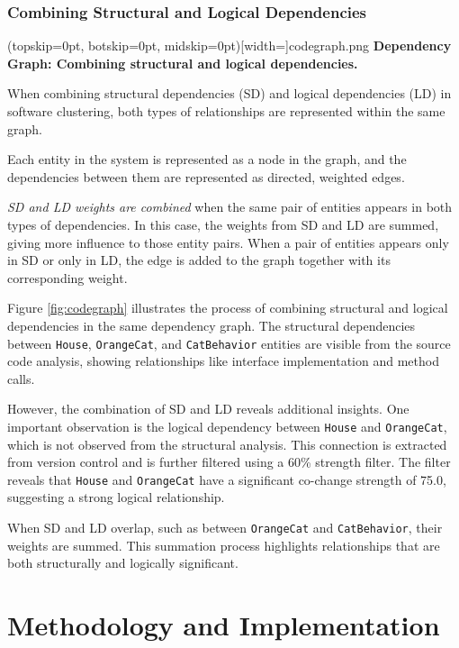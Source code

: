 \documentclass{ieeeaccess}
\begin{document}
\subsubsection{Combining Structural and Logical Dependencies}

\Figure[t!](topskip=0pt, botskip=0pt, midskip=0pt)[width=\textwidth]{codegraph.png}
{ \textbf{Dependency Graph: Combining structural and logical dependencies.}\label{fig:codegraph}}

When combining structural dependencies (SD) and logical dependencies (LD) in software clustering, both types of relationships are represented within the same graph.

Each entity in the system is represented as a node in the graph, and the dependencies between them are represented as directed, weighted edges.

\textit{SD and LD weights are combined} when the same pair of entities appears in both types of dependencies. In this case, the weights from SD and LD are summed, giving more influence to those entity pairs. When a pair of entities appears only in SD or only in LD, the edge is added to the graph together with its corresponding weight.

Figure \ref{fig:codegraph} illustrates the process of combining structural and logical dependencies in the same dependency graph. The structural dependencies between \texttt{House}, \texttt{OrangeCat}, and \texttt{CatBehavior} entities are visible from the source code analysis, showing relationships like interface implementation and method calls.

However, the combination of SD and LD reveals additional insights. One important observation is the logical dependency between \texttt{House} and \texttt{OrangeCat}, which is not observed from the structural analysis. This connection is extracted from version control and is further filtered using a 60\% strength filter. The filter reveals that \texttt{House} and \texttt{OrangeCat} have a significant co-change strength of 75.0, suggesting a strong logical relationship.

When SD and LD overlap, such as between \texttt{OrangeCat} and \texttt{CatBehavior}, their weights are summed. This summation process highlights relationships that are both structurally and logically significant.





\section{Methodology and Implementation}
\label{sec:methodology_implementation}
\end{document}
